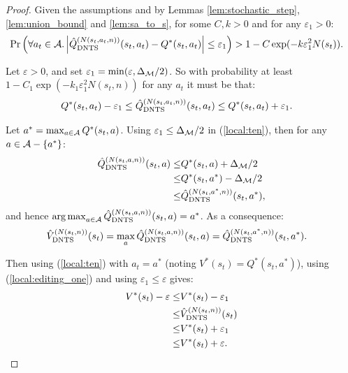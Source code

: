         \begin{proof}
            Given the assumptions and by Lemmas \ref{lem:stochastic_step}, \ref{lem:union_bound} and \ref{lem:sa_to_s}, for some $C,k>0$ and for any $\varepsilon_1>0$:
            \begin{align}
                \Pr\left(\forall a_t\in\mathcal{A}. \left|{\hat{Q}^{(N(s_t,a_t,n))}_{{\textnormal{DNTS}}}}(s_t,a_t)-Q^*(s_t,a_t)\right|
                    \leq \varepsilon_1\right) &> 1-C \exp(-k \varepsilon_1^2 N(s_t)).
            \end{align}
            
            Let $\varepsilon >0$, and set $\varepsilon_1 = \min(\varepsilon,\Delta_{\mathcal{M}}/2)$. So with probability at least $1-C_1 \exp(-k_1 \varepsilon_1^2 N(s_t,n))$ for any $a_t$ it must be that:
            \begin{align}
                Q^*(s_t,a_t) - \varepsilon_1 \leq {\hat{Q}^{(N(s_t,a_t,n))}_{{\textnormal{DNTS}}}}(s_t,a_t) &\leq Q^*(s_t,a_t) + \varepsilon_1. 
                    \label{local:ten}
            \end{align}
            
            Let $a^*=\max_{a\in\mathcal{A}} Q^*(s_t,a)$. Using $\varepsilon_1 \leq \Delta_{\mathcal{M}}/2$ in (\ref{local:ten}), then for any $a\in\mathcal{A}-\{ a^*\}$:
            \begin{align}
                {\hat{Q}^{(N(s_t,a,n))}_{{\textnormal{DNTS}}}}(s_t,a) \leq& Q^*(s_t,a) + \Delta_{\mathcal{M}}/2 \\
                    \leq& Q^*(s_t,a^*) - \Delta_{\mathcal{M}}/2 \\
                    \leq& {\hat{Q}^{(N(s_t,a^*,n))}_{{\textnormal{DNTS}}}}(s_t,a^*),
            \end{align}
            and hence $\operatorname*{arg\,max}_{a\in\mathcal{A}} {\hat{Q}^{(N(s_t,a,n))}_{{\textnormal{DNTS}}}}(s_t,a) = a^*$. As a consequence:
            \begin{align}
                {\hat{V}^{(N(s_t,n))}_{{\textnormal{DNTS}}}}(s_t) &= \max_a {\hat{Q}^{(N(s_t,a,n))}_{{\textnormal{DNTS}}}}(s_t,a) = {\hat{Q}^{(N(s_t,a^*,n))}_{{\textnormal{DNTS}}}}(s_t,a^*). 
                    \label{local:editing_one}
            \end{align}
            
            Then using (\ref{local:ten}) with $a_t=a^*$ (noting $V^*(s_t)=Q^*(s_t,a^*)$), using (\ref{local:editing_one}) and using $\varepsilon_1 \leq \varepsilon$ gives:
            \begin{align}
                V^*(s_t) - \varepsilon
                    \leq& V^*(s_t) - \varepsilon_1 \\
                    \leq& {\hat{V}^{(N(s_t,n))}_{{\textnormal{DNTS}}}}(s_t) \\
                    \leq& V^*(s_t) + \varepsilon_1 \\
                    \leq& V^*(s_t) + \varepsilon. 
            \end{align}
            

\end{proof}
